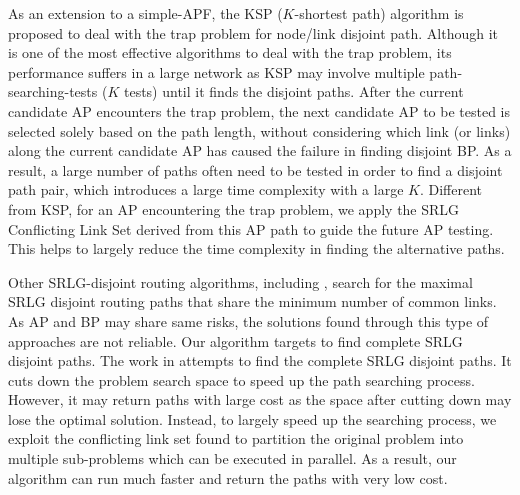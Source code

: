 As an extension to a simple-APF, the KSP ($K$-shortest path) algorithm \cite{eppstein1998finding}  is proposed to deal with the trap problem for node/link disjoint path. Although it is one of the most effective algorithms to deal with the trap problem,  its performance suffers in a large network  as KSP may involve multiple path-searching-tests ($K$ tests) until it finds the disjoint paths. After the current candidate AP encounters the trap problem, the next candidate AP to be tested is selected solely based on the path length, without considering which link (or links) along the current candidate AP has caused the failure in finding disjoint BP. As a result, a large number of paths often need to be tested in order to find a disjoint path pair, which introduces a large time complexity with a large $K$. Different from KSP, for an  AP encountering the trap problem, we apply the SRLG Conflicting Link Set derived from this AP path to guide the future AP testing. This helps to largely reduce the time complexity in finding the alternative paths.



Other SRLG-disjoint routing algorithms, including \cite{rostami2012msdp,rostami2007cose,datta2008graph,xu2003new,todimala2004imsh}, search for the maximal SRLG disjoint routing paths that share the minimum number of common links. As AP and BP may share same risks, the solutions found through this type of approaches are not reliable. Our algorithm targets to find complete SRLG disjoint paths. The work in \cite{xu2003trap} attempts to find the complete SRLG disjoint paths.  It cuts down the problem search space to speed up the path searching process. However, it may return paths with large cost as the space after cutting down may lose the optimal solution. %
 Instead, to largely speed up the searching process, we exploit the conflicting link set found to partition the original problem into multiple sub-problems which can  be executed in parallel. As a result, our algorithm can run much faster and return the paths with very low cost. %


